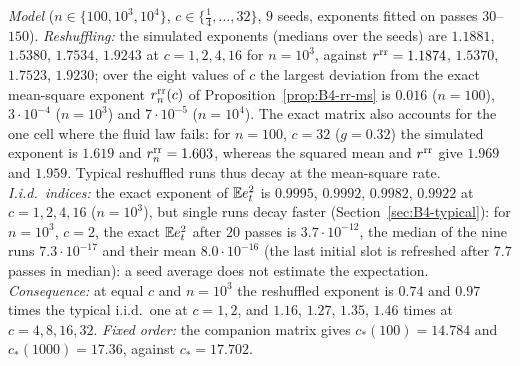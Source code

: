 \emph{Model} ($n\in\{100,10^3,10^4\}$, $c\in\{\frac14,\dots,32\}$, $9$ seeds, exponents fitted on passes $30$--$150$). \emph{Reshuffling:} the simulated exponents (medians over the seeds) are $1.1881$, $1.5380$, $1.7534$, $1.9243$ at $c=1,2,4,16$ for $n=10^3$, against $r^{\rm rr}=1.1874$, $1.5370$, $1.7523$, $1.9230$; over the eight values of $c$ the largest deviation from the exact mean-square exponent $r^{\rm rr}_n(c)$ of Proposition~\ref{prop:B4-rr-ms} is $0.016$ ($n=100$), $3\cdot10^{-4}$ ($n=10^3$) and $7\cdot10^{-5}$ ($n=10^4$). The exact matrix also accounts for the one cell where the fluid law fails: for $n=100$, $c=32$ ($g=0.32$) the simulated exponent is $1.619$ and $r^{\rm rr}_n=1.603$, whereas the squared mean and $r^{\rm rr}$ give $1.969$ and $1.959$. Typical reshuffled runs thus decay at the mean-square rate. \emph{I.i.d.\ indices:} the exact exponent of $\mathbb{E} e_t^2$ is $0.9995$, $0.9992$, $0.9982$, $0.9922$ at $c=1,2,4,16$ ($n=10^3$), but single runs decay faster (Section~\ref{sec:B4-typical}): for $n=10^3$, $c=2$, the exact $\mathbb{E} e_t^2$ after $20$ passes is $3.7\cdot10^{-12}$, the median of the nine runs $7.3\cdot10^{-17}$ and their mean $8.0\cdot10^{-16}$ (the last initial slot is refreshed after $7.7$ passes in median): a seed average does not estimate the expectation. \emph{Consequence:} at equal $c$ and $n=10^3$ the reshuffled exponent is $0.74$ and $0.97$ times the typical i.i.d.\ one at $c=1,2$, and $1.16$, $1.27$, $1.35$, $1.46$ times at $c=4,8,16,32$. \emph{Fixed order:} the companion matrix gives $c_\ast(100)=14.784$ and $c_\ast(1000)=17.36$, against $c_\ast=17.702$.

